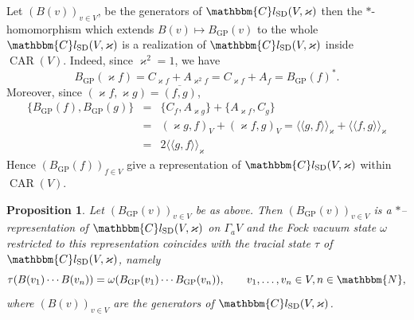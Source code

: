\documentclass[11pt]{article}
\newcommand{\llangle}{{\langle\!\langle}}
\newcommand{\rrangle}{{\rangle\!\rangle}}
\newcommand{\tmop}[1]{\ensuremath{\operatorname{#1}}}
\newtheorem{proposition}{Proposition}
{\theorembodyfont{\rmfamily}\newtheorem{remark}{Remark}}
\begin{document}
\begin{remark}
  \label{GPrem:GP-CAR}Let $(B (v))_{v \in V}$, be the generators of
  $\mathbbm{C}l_{\tmop{SD}} (V, \varkappa)$ then the $\ast$-homomorphism which
  extends $B (v) \mapsto B_{\tmop{GP}} (v)$ to the whole
  $\mathbbm{C}l_{\tmop{SD}} (V, \varkappa)$ is a realization of
  $\mathbbm{C}l_{\tmop{SD}} (V, \varkappa)$ inside $\tmop{CAR} (V)$. Indeed,
  since $\varkappa^2 = 1$, we have
  \[ B_{\tmop{GP}} (\varkappa f) = C_{\varkappa f} + A_{\varkappa^2 f} =
     C_{\varkappa f} + A_f = B_{\tmop{GP}} (f)^{\ast} . \]
  Moreover, since $(\varkappa f, \varkappa g) = \overline{(f, g)}$,
  \begin{eqnarray*}
    \{ B_{\tmop{GP}} (f), B_{\tmop{GP}} (g) \} & = & \{ C_f, A_{\varkappa g}
    \} + \{ A_{\varkappa f}, C_g \}\\
    & = & (\varkappa g, f)_V + (\varkappa f, g)_V = \llangle g, f
    \rrangle_{\varkappa} + \llangle f, g \rrangle_{\varkappa}\\
    & = & 2 \llangle g, f \rrangle_{\varkappa}
  \end{eqnarray*}
  Hence $(B_{\tmop{GP}} (f))_{f \in V}$ give a representation of
  $\mathbbm{C}l_{\tmop{SD}} (V, \varkappa)$ within $\tmop{CAR} (V)$.
\end{remark}

\begin{proposition}
  Let $(B_{\tmop{GP}} (v))_{v \in V}$ be as above. Then $(B_{\tmop{GP}}
  (v))_{v \in V}$ is a $\ast$--representation of $\mathbbm{C}l_{\tmop{SD}} (V,
  \varkappa)$ on $\Gamma_a V$ and the Fock vacuum state $\omega$ restricted to
  this representation coincides with the tracial state $\tau$ of
  $\mathbbm{C}l_{\tmop{SD}} (V, \varkappa)$, namely
  \begin{equation}
    \tau (B (v_1) \cdots B (v_n)) = \omega (B_{\tmop{GP}} (v_1) \cdots
    B_{\tmop{GP}} (v_n)), \qquad v_1, \ldots, v_n \in V, n \in \mathbbm{N},
    \label{eq:equiv-gp}
  \end{equation}
  where $(B (v))_{v \in V}$ are the generators of $\mathbbm{C}l_{\tmop{SD}} (V,
  \varkappa)$. 
\end{proposition}
\end{document}
